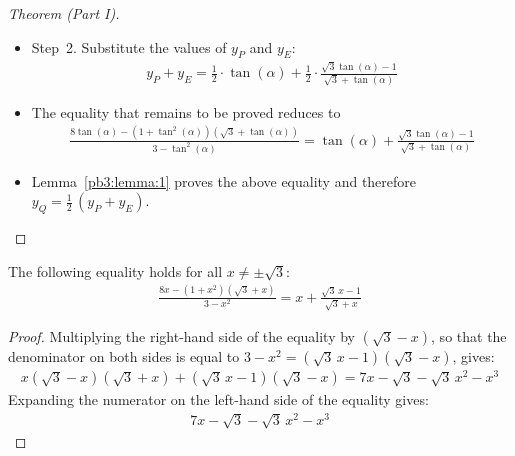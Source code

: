 \begin{proof}[Theorem (Part I)]
\begin{itemize}
\item Step~2. Substitute the values of $y_{P}$ and $y_{E}$:
\begin{align*}
y_{P} + y_{E}
= \frac{1}{2} \cdot \tan(\alpha) + \frac{1}{2} \cdot \frac{\sqrt{3}\tan(\alpha)-1}{\sqrt{3}+\tan(\alpha)}
\end{align*}
\item The equality that remains to be proved reduces to
\begin{align*}
\frac{8\tan(\alpha)-(1+\tan^{2}(\alpha))(\sqrt{3}+\tan(\alpha))}{3 - \tan^{2}(\alpha)}
= \tan(\alpha) + \frac{\sqrt{3}\tan(\alpha)-1}{\sqrt{3}+\tan(\alpha)}
\end{align*}
\item Lemma~\ref{pb3:lemma:1} proves the above equality and therefore $y_{Q}=\frac{1}{2} \, (y_{P} + y_{E})$.
\end{itemize}
\end{proof}

\begin{lemma}\label{pb3:lemma:1}
The following equality holds for all $x\ne\pm\sqrt{3}$:
\begin{align*}
\frac{8x-(1+x^{2})(\sqrt{3}+x)}{3-x^{2}} 
= x + \frac{\sqrt{3}\,x-1}{\sqrt{3}+x}
\end{align*}
\end{lemma}
\begin{proof}
Multiplying the right-hand side of the equality by $(\sqrt{3}-x)$, so that the denominator on both sides is equal to $3-x^{2}=(\sqrt{3}\,x-1)(\sqrt{3}-x)$, gives:
\begin{align*}
x(\sqrt{3}-x)(\sqrt{3}+x)+(\sqrt{3}\,x-1)(\sqrt{3}-x)
= 7x-\sqrt{3}-\sqrt{3}\,x^{2}-x^{3}
\end{align*}
Expanding the numerator on the left-hand side of the equality gives:
\begin{align*}
7x-\sqrt{3}-\sqrt{3}\,x^{2}-x^{3}
\end{align*}
\end{proof}


